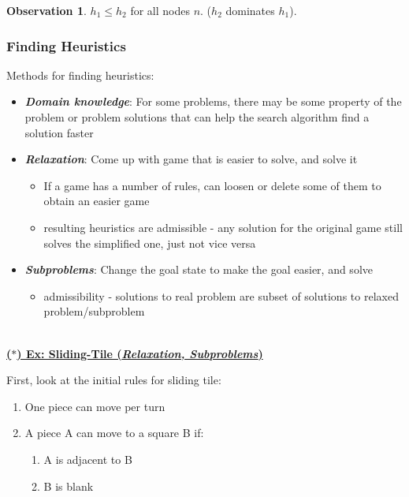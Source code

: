 \documentclass[12pt]{extarticle}
\theoremstyle{definition}
\newtheorem*{observation}{Observation}
\theoremstyle{remark}
\newcommand{\pstart}[0]{\noindent}
\newcommand{\newp}[0]{~\\ \pstart}
\newcommand{\term}[1]{\noindent\textbf{\textit{#1}}}
\newcommand{\titleul}[1]{\noindent \textbf{\ul{#1}}}
\begin{document}
\vspace{5pt}
\begin{observation}
    $h_1\leq h_2$ for all nodes $n$. ($h_2$ dominates $h_1$).
\end{observation}

\iffalse
~\\ \titleul{Effective Branching Factors}:
\begin{enumerate}
    \item $h_0$: 2.78
    \item $h_1$: $\sim$1.48
    \item $h_2$: $\sim$1.26
\end{enumerate}
\fi


\subsubsection{Finding Heuristics}
Methods for finding heuristics: \begin{itemize}
    \item \term{Domain knowledge}: For some problems, there may be some property of the problem or problem solutions that can help the search algorithm find a solution faster
    \item \term{Relaxation}: Come up with game that is easier to solve, and solve it \begin{itemize}
        \item If a game has a number of rules, can loosen or delete some of them to obtain an easier game
        \item resulting heuristics are admissible - any solution for the original game still solves the simplified one, just not vice versa
    \end{itemize}
    \item \term{Subproblems}: Change the goal state to make the goal easier, and solve \begin{itemize}
        \item admissibility - solutions to real problem are subset of solutions to relaxed problem/subproblem
    \end{itemize}
\end{itemize}

\newp
\titleul{($\ast$) Ex: Sliding-Tile (\textit{Relaxation, Subproblems})}

\vspace{8pt} \pstart
First, look at the initial rules for sliding tile: \begin{enumerate}
    \item One piece can move per turn
    \item A piece A can move to a square B if: \begin{enumerate}
        \item A is adjacent to B
        \item B is blank
    \end{enumerate}
\end{enumerate}
\end{document}
